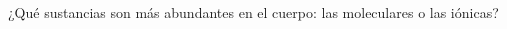 ¿Qué sustancias son más abundantes en el cuerpo: las moleculares o las iónicas?

\begin{solutionbox}{2cm}

\end{solutionbox}
